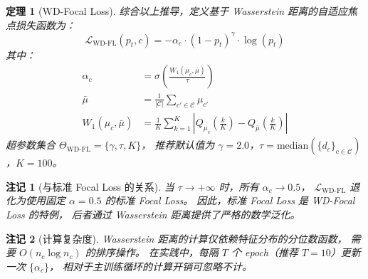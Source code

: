 \documentclass[12pt, a4paper]{ctexart}
\newtheorem{theorem}{定理}[section]
\newtheorem{remark}{注记}[section]
\begin{document}
\begin{theorem}[WD-Focal Loss]
\label{thm:wd_focal_loss}
综合以上推导，定义基于 Wasserstein 距离的自适应焦点损失函数为：
\begin{equation}
    \boxed{
    \mathcal{L}_{\mathrm{WD\text{-}FL}}(p_t, c)
    = -\alpha_c \cdot (1 - p_t)^{\gamma} \cdot \log(p_t)
    }
    \label{eq:wd_focal_loss}
\end{equation}
其中：
\begin{align}
    \alpha_c &= \sigma\!\left(\frac{W_1(\mu_c, \bar{\mu})}{\tau}\right) \label{eq:alpha_final} \\
    \bar{\mu} &= \frac{1}{|\mathcal{C}|} \sum_{c' \in \mathcal{C}} \mu_{c'} \label{eq:mu_bar_final} \\
    W_1(\mu_c, \bar{\mu}) &= \frac{1}{K} \sum_{k=1}^{K}
    \left| Q_{\mu_c}\!\left(\tfrac{k}{K}\right) - Q_{\bar{\mu}}\!\left(\tfrac{k}{K}\right) \right|
    \label{eq:w1_final}
\end{align}
超参数集合 $\Theta_{\mathrm{WD\text{-}FL}} = \{\gamma, \tau, K\}$，
推荐默认值为 $\gamma = 2.0$，$\tau = \mathrm{median}(\{d_c\}_{c \in \mathcal{C}})$，$K = 100$。
\end{theorem}

\begin{remark}[与标准 Focal Loss 的关系]
当 $\tau \to +\infty$ 时，所有 $\alpha_c \to 0.5$，
$\mathcal{L}_{\mathrm{WD\text{-}FL}}$ 退化为使用固定 $\alpha = 0.5$ 的标准 Focal Loss。
因此，标准 Focal Loss 是 WD-Focal Loss 的特例，
后者通过 Wasserstein 距离提供了严格的数学泛化。
\end{remark}

\begin{remark}[计算复杂度]
Wasserstein 距离的计算仅依赖特征分布的分位数函数，
需要 $O(n_c \log n_c)$ 的排序操作。
在实践中，每隔 $T$ 个 epoch（推荐 $T = 10$）更新一次 $\{\alpha_c\}$，
相对于主训练循环的计算开销可忽略不计。
\end{remark}
\end{document}
